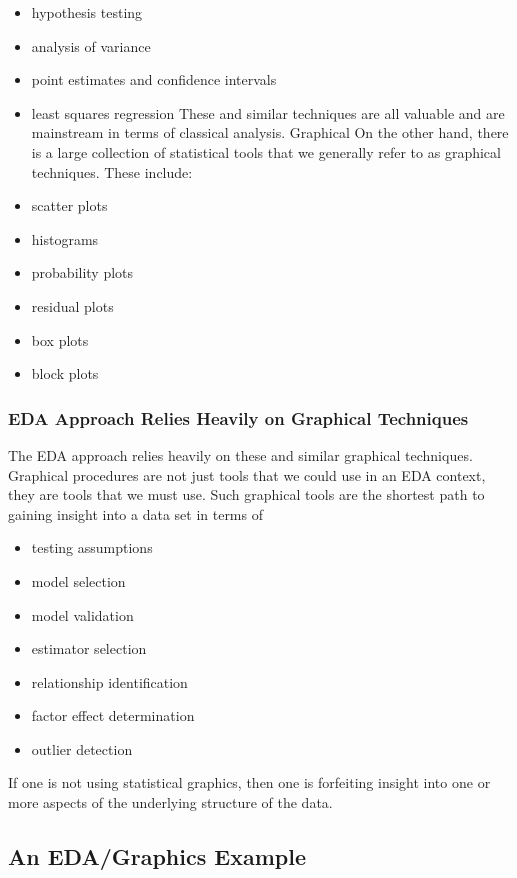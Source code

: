 \documentclass[]{book}
\providecommand{\tightlist}{%
  \setlength{\itemsep}{0pt}\setlength{\parskip}{0pt}}
\theoremstyle{definition}
\theoremstyle{definition}
\theoremstyle{definition}
\theoremstyle{remark}
\begin{document}
\begin{itemize}
\item
  hypothesis testing
\item
  analysis of variance
\item
  point estimates and confidence intervals
\item
  least squares regression These and similar techniques are all valuable
  and are mainstream in terms of classical analysis. Graphical On the
  other hand, there is a large collection of statistical tools that we
  generally refer to as graphical techniques. These include:
\item
  scatter plots
\item
  histograms
\item
  probability plots
\item
  residual plots
\item
  box plots
\item
  block plots
\end{itemize}

\subsubsection{EDA Approach Relies Heavily on Graphical
Techniques}\label{eda-approach-relies-heavily-on-graphical-techniques}

The EDA approach relies heavily on these and similar graphical
techniques. Graphical procedures are not just tools that we could use in
an EDA context, they are tools that we must use. Such graphical tools
are the shortest path to gaining insight into a data set in terms of

\begin{itemize}
\tightlist
\item
  testing assumptions
\item
  model selection
\item
  model validation
\item
  estimator selection
\item
  relationship identification
\item
  factor effect determination
\item
  outlier detection
\end{itemize}

If one is not using statistical graphics, then one is forfeiting insight
into one or more aspects of the underlying structure of the data.

\subsection{An EDA/Graphics Example}\label{an-edagraphics-example}
\end{document}

